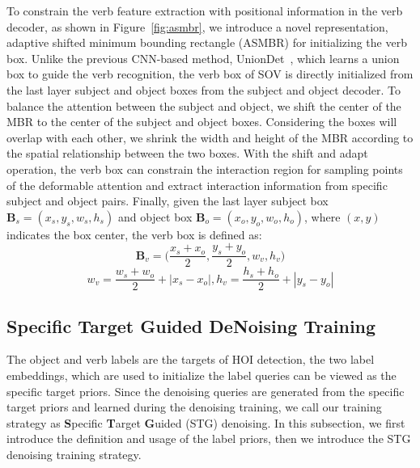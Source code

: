 \documentclass[10pt,twocolumn,letterpaper]{article}
\begin{document}
\quad To constrain the verb feature extraction with positional information in the verb decoder, as shown in Figure~\ref{fig:asmbr}, we introduce a novel representation, adaptive shifted minimum bounding rectangle (ASMBR) for initializing the verb box.
Unlike the previous CNN-based method, UnionDet~\cite{kim2020uniondet}, which learns a union box to guide the verb recognition, the verb box of SOV is directly initialized from the last layer subject and object boxes from the subject and object decoder.
To balance the attention between the subject and object, we shift the center of the MBR to the center of the subject and object boxes.
Considering the boxes will overlap with each other, we shrink the width and height of the MBR according to the spatial relationship between the two boxes.
With the shift and adapt operation, the verb box can constrain the interaction region for sampling points of the deformable attention and extract interaction information from specific subject and object pairs.
Finally, given the last layer subject box $\bm{B}_s=(x_s, y_s, w_s, h_s)$ and object box $\bm{B}_o=(x_o, y_o, w_o, h_o)$, where $(x,y)$ indicates the box center, the verb box is defined as:
\begin{equation}
    \bm{B}_{v} = \bigg(\frac{x_s + x_o}{2}, \frac{y_s + y_o}{2}, w_{v}, h_{v}\bigg)
\end{equation}
\begin{equation}
    w_{v} = \frac{w_s + w_o}{2}+|x_s-x_o|, h_{v} = \frac{h_s + h_o}{2}+|y_s-y_o|
\end{equation}

\subsection{Specific Target Guided DeNoising Training}
The object and verb labels are the targets of HOI detection, the two label embeddings, which are used to initialize the label queries can be viewed as the specific target priors.
Since the denoising queries are generated from the specific target priors and learned during the denoising training, we call our training strategy as \textbf{S}pecific \textbf{T}arget \textbf{G}uided (STG) denoising.
In this subsection, we first introduce the definition and usage of the label priors, then we introduce the STG denoising training strategy.
\end{document}
